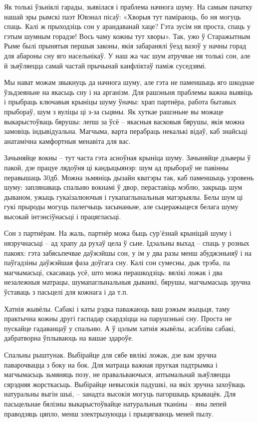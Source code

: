 Як толькі ўзьніклі гарады, зьявілася і праблема начнога шуму. На самым пачатку нашай эры рымскі паэт Ювэнал пісаў: «Хворыя тут паміраюць, бо ня могуць спаць. Калі ж прыходзіць сон у арандаванай хаце? Гэта зусім ня проста, спаць у гэтым шумным горадзе! Вось чаму кожны тут хворы». Так, ужо ў Старажытным Рыме былі прынятыя першыя законы, якія забаранялі ўезд вазоў у начны горад для абароны сну яго насельнікаў. У наш жа час шум атручвае ня толькі сон, але й зьяўляецца самай частай прычынай канфліктаў паміж суседзямі.

Мы нават можам звыкнуць да начнога шуму, але гэта не паменшыць яго шкоднае ўзьдзеяньне на якасьць сну і на арганізм. Для рашэньня праблемы важна выявіць і прыбраць ключавыя крыніцы шуму ўначы: храп партнёра, работа бытавых прыбораў, шум з вуліцы ці з-за сьцяны. Як хуткае рашэньне вы можаце выкарыстоўваць бярушы: лепш за ўсё – якасныя васковыя бярушы, якія можна замовіць індывідуальна. Магчыма, варта перабраць некалькі відаў, каб знайсьці анатамічна камфортныя менавіта для вас.

Зачыняйце вокны – тут часта гэта асноўная крыніца шуму. Зачыняйце дзьверы ў пакой, дзе працуе лядоўня ці кандыцыянэр: шум ад прыбораў не павінны перавышаць 30дб. Можна зьмяніць дызайн кватэры так, каб паменшыць узровень шуму: заплянаваць спальню вокнамі ў двор, пераставіць мэблю, закрыць шум дываном, ужыць гукаізалюючыя і гукапаглынальныя матэрыялы. Белы шум ці гукі прыроды могуць палегчыць засынаньне, але сьцеражыцеся белага шуму высокай інтэнсіўнасьці і працягласьці.

Сон з партнёрам. На жаль, партнёр можа быць сур'ёзнай крыніцай шуму і нязручнасьці – ад храпу да рухаў цела ў сьне. Ідэальны выхад – спаць у розных пакоях: гэта забясьпечвае даўжэйшы сон, у ім у два разы менш абуджэньняў і на паўгадзіны даўжэйшая фаза доўгага сну. Калі сон сумесны, дык трэба, па магчымасьці, скасаваць усё, што можа перашкодзіць: вялікі ложак і два незалежныя матрацы, шумапаглынальныя дыванкі, бярушы, магчымасьць зручна ўставаць з пасьцелі для кожнага і да т.п.

Хатнія жывёлы. Сабакі і каты рэдка паважаюць ваш рэжым жыцьця, таму практычна кожны другі гаспадар скардзіцца на парушэньні сну. Проста не пускайце гадаванцаў у спальню. А ў цэлым хатнія жывёлы, асабліва сабакі, дабратворна ўплываюць на вашае здароўе.

Спальны рыштунак. Выбірайце для сябе вялікі ложак, дзе вам зручна паварочвацца з боку на бок. Для матраца важная пругкая падтрымка і магчымасьць зьмяняць позу, не правальваючыся, аптымальнай зьяўляецца сярэдняя жорсткасьць. Выбірайце невысокія падушкі, на якіх зручна захоўваць натуральны выгін шыі, – занадта высокія могуць пагоршыць крывацёк. Для пасьцельнае бялізны выкарыстоўвайце натуральныя тканіны – яны лепей праводзяць цяпло, менш электрызуюцца і прыцягваюць меней пылу.

